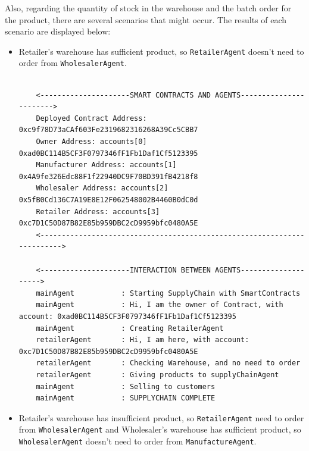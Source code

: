 \vspace{.5cm}

Also, regarding the quantity of stock in the warehouse and the batch order for the product, there are several scenarios that might occur. The results of each scenario are displayed below:

\vspace{.5cm}

\begin{itemize}
    \item Retailer's warehouse has sufficient product, so \texttt{RetailerAgent} doesn't need to order from \texttt{WholesalerAgent}.

    \vspace{.5cm}
    \begin{lstlisting}[numbers=none, basicstyle=\ttfamily\tiny]
    
    <---------------------SMART CONTRACTS AND AGENTS----------------------->
    Deployed Contract Address: 0xc9f78D73aCAf603Fe2319682316268A39Cc5CBB7
    Owner Address: accounts[0] 0xad0BC114B5CF3F0797346fF1Fb1Daf1Cf5123395
    Manufacturer Address: accounts[1] 0x4A9fe326Edc88F1f22940DC9F70BD391fB4218f8
    Wholesaler Address: accounts[2] 0x5fB0Cd136C7A19E8E12F062548002B4460B0dC0d
    Retailer Address: accounts[3] 0xc7D1C50D87B82E85b959DBC2cD9959bfc0480A5E
    <------------------------------------------------------------------------>
    
    <---------------------INTERACTION BETWEEN AGENTS-------------------->
    mainAgent           : Starting SupplyChain with SmartContracts
    mainAgent           : Hi, I am the owner of Contract, with account: 0xad0BC114B5CF3F0797346fF1Fb1Daf1Cf5123395
    mainAgent           : Creating RetailerAgent
    retailerAgent       : Hi, I am here, with account: 0xc7D1C50D87B82E85b959DBC2cD9959bfc0480A5E
    retailerAgent       : Checking Warehouse, and no need to order
    retailerAgent       : Giving products to supplyChainAgent
    mainAgent           : Selling to customers
    mainAgent           : SUPPLYCHAIN COMPLETE
    \end{lstlisting}
    
    \vspace{.5cm}
    
    \item Retailer's warehouse has insufficient product, so \texttt{RetailerAgent} need to order from \texttt{WholesalerAgent} and Wholesaler's warehouse has sufficient product, so \texttt{WholesalerAgent} doesn't need to order from \texttt{ManufactureAgent}.


\end{itemize}
